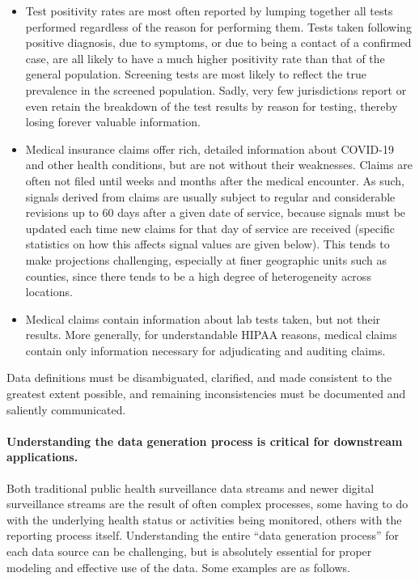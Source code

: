 \documentclass{article}
\begin{document}
\begin{itemize}
\item Test positivity rates are most often reported by lumping together all
  tests performed regardless of the reason for performing them.  Tests taken
  following positive diagnosis, due to symptoms, or due to being a contact of a
  confirmed case, are all likely to have a much higher positivity rate than that
  of the general population.  Screening tests are most likely to reflect the
  true prevalence in the screened population.  Sadly, very few jurisdictions
  report or even retain the breakdown of the test results by reason for testing,
  thereby losing forever valuable information. 

\item Medical insurance claims offer rich, detailed information about COVID-19
  and other health conditions, but are not without their weaknesses.  Claims are
  often not filed until weeks and months after the medical encounter.  As such,
  signals derived from claims are usually subject to regular and considerable
  revisions up to 60 days after a given date of service, because signals must be
  updated each time new claims for that day of service are received (specific
  statistics on how this affects signal values are given below).  This tends to
  make projections challenging, especially at finer geographic units such as
  counties, since there tends to be a high degree of heterogeneity across
  locations.  

\item Medical claims contain information about lab tests taken, but not their
  results.  More generally, for understandable HIPAA reasons, medical claims
  contain only information necessary for adjudicating and auditing claims.   
\end{itemize}

Data definitions must be disambiguated, clarified, and made consistent to the
greatest extent possible, and remaining inconsistencies must be documented and
saliently communicated.  

\paragraph{Understanding the data generation process is critical for downstream
  applications.}

Both traditional public health surveillance data streams and newer digital
surveillance streams are the result of often complex processes, some having to
do with the underlying health status or activities being monitored, others with
the reporting process itself.  Understanding the entire ``data generation
process'' for each data source can be challenging, but is absolutely essential
for proper modeling and effective use of the data.  Some examples are as
follows.
\end{document}
